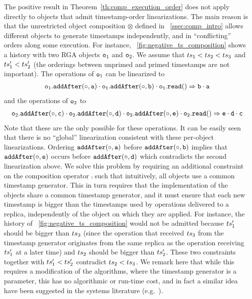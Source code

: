 The positive result in Theorem~\ref{th:comp_execution_order} does not apply directly to objects that admit timestamp-order linearizations. The main reason is that the unrestricted object composition $\otimes$ defined in \sectionautorefname~\ref{ssec:comp_intro} allows different objects to generate timestamps independently, and in ``conflicting'' orders along some execution. For instance, \figureautorefname~\ref{fig:negative_ts_composition} shows a history with two RGA objects $\mathtt{o}_1$ and $\mathtt{o}_2$. We assume that $ts_1 < ts_2 < ts_3$ and $ts'_1 < ts'_2$ (the orderings between unprimed and primed timestamps are not important). The operations of $\mathtt{o}_1$ can be linearized to
\begin{align*}
\aobj_1.\alabelshort[{\tt addAfter}]{\circ,a}\cdot \aobj_1.\alabelshort[{\tt addAfter}]{\circ,b}\cdot \aobj_1.\alabellongind[{\tt read}]{}{b\cdot a}{}
\end{align*}
and the operations of $\mathtt{o}_2$ to
\begin{align*}
\aobj_2.\alabelshort[{\tt addAfter}]{\circ,c}\cdot \aobj_2.\alabelshort[{\tt addAfter}]{\circ,d}\cdot \aobj_2.\alabelshort[{\tt addAfter}]{\circ,e}\cdot \aobj_2.\alabellongind[{\tt read}]{}{e\cdot d\cdot c}{}
\end{align*}
Note that these are the only  possible for these operations. It can be easily seen that there is no ``global'' linearization consistent with these per-object linearizations. Ordering $\alabelshort[{\tt addAfter}]{\circ,a}$ before $\alabelshort[{\tt addAfter}]{\circ,b}$ implies that $\alabelshort[{\tt addAfter}]{\circ,e}$ occurs before $\alabelshort[{\tt addAfter}]{\circ,d}$ which contradicts the second linearization above.
We solve this problem by requiring an additional constraint on the composition operator $\comp$ such that intuitively, all objects use a common timestamp generator. This in turn requires that the implementation of the objects share a common timestamp generator, and it must ensure that each new timestamp is bigger than the  timestamps used by operations delivered to a replica, independently of the object on which they are applied. For instance, the history of \figureautorefname~\ref{fig:negative_ts_composition} would not be admitted because $ts_1'$ should be bigger than $ts_3$ (since the operation that received $ts_3$ from the timestamp generator originates from the same replica as the operation receiving $ts_1'$ at a later time) and $ts_2$ should be bigger than $ts_2'$. These two constraints together with $ts_1'<ts_2'$ contradict $ts_2 < ts_3$.
%
We remark here that while this requires a modification of the algorithms, where the timestamp generator is a parameter, this has no algorithmic or run-time cost, and in fact a similar idea have been suggested in the systems literature (e.g.~\cite{EnesPB17}).

